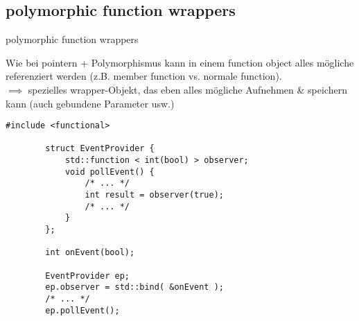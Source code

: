 \subsection{ polymorphic function wrappers }

\begin{frame}[fragile]{ polymorphic function wrappers }
	\footnotesize
	
	Wie bei pointern + Polymorphismus kann in einem function object alles mögliche referenziert werden (z.B. member function vs. normale function).	\\
	$\implies$ spezielles wrapper-Objekt, das eben alles mögliche Aufnehmen \& speichern kann (auch gebundene Parameter usw.)
	
	\pause
	
	\begin{lstlisting}[basicstyle=\scriptsize]
		#include <functional>
		
		struct EventProvider {
			std::function < int(bool) > observer;
			void pollEvent() {
				/* ... */
				int result = observer(true);
				/* ... */
			}
		};
		
		int onEvent(bool);
		
		EventProvider ep;
		ep.observer = std::bind( &onEvent );
		/* ... */
		ep.pollEvent();
	\end{lstlisting}
\end{frame}
